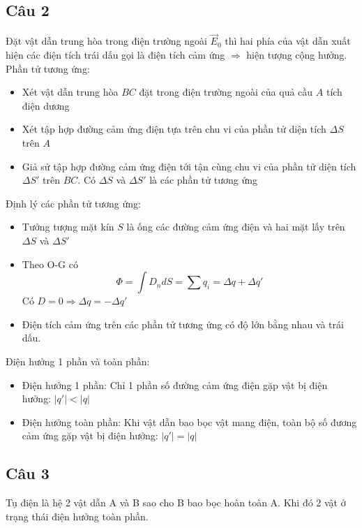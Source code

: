 \subsection{Câu 2}

Đặt vật dẫn trung hòa trong điện trường ngoài $\vec{E}_0$ thì hai phía của vật dẫn xuất hiện các điện tích trái dấu gọi là điện tích cảm ứng $\Rightarrow$ hiện tượng cộng hưởng.\\

Phần tử tương ứng:
\begin{itemize}
  \item Xét vật dẫn trung hòa $BC$ đặt trong điện trường ngoài của quả cầu $A$ tích điện dương
  \item Xét tập hợp đường cảm ứng điện tựa trên chu vi của phần tử diện tích $\Delta S$ trên $A$
  \item Giả sử tập hợp đường cảm ứng điện tới tận cùng chu vi của phần tử diện tích $\Delta S'$ trên $BC$. Có $\Delta S$ và $\Delta S'$ là các phần tử tương ứng
\end{itemize}

Định lý các phần tử tương ứng:
\begin{itemize}
  \item Tưởng tượng mặt kín $S$ là ống các đường cảm ứng điện và hai mặt lấy trên $\Delta S$ và $\Delta S'$
  \item Theo O-G có 
  \begin{equation*}
    \Phi = \int D_ndS = \sum q_i = \Delta q + \Delta q'
  \end{equation*}
  Có $D = 0 \Rightarrow \Delta q = - \Delta q'$ 
  \item Điện tích cảm ứng trên các phần tử tương ứng có độ lớn bằng nhau và trái dấu.
\end{itemize}

Điện hưởng 1 phần và toàn phần:
\begin{itemize}
  \item Điện hưởng 1 phần: Chỉ 1 phần số đường cảm ứng điện gặp vật bị điện hưởng: $|q'| < |q|$
  \item Điện hưởng toàn phần: Khi vật dẫn bao bọc vật mang điện, toàn bộ số đương cảm ứng gặp vật bị điện hưởng: $|q'| = |q|$
\end{itemize}

\subsection{Câu 3}

Tụ điện là hệ 2 vật dẫn A và B sao cho B bao bọc hoàn toàn A. Khi đó 2 vật ở trạng thái điện hưởng toàn phần.

